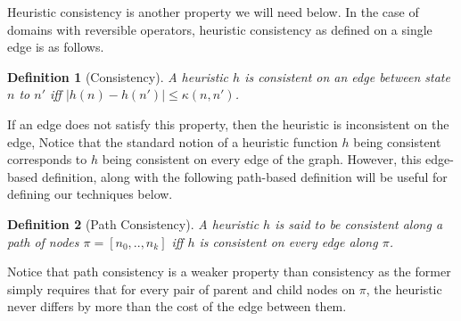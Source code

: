 \documentclass[letterpaper]{article}
\newtheorem{definition}{Definition}
\begin{document}


Heuristic consistency is another property we will need below. In the case of domains with reversible operators, heuristic consistency as defined on a single edge is as follows.

\begin{definition}[Consistency]
A heuristic $h$ is consistent on an edge between state $n$ to $n'$ iff $|h(n) - h(n')| \le \kappa(n,n')$.
\label{def:consistency}
\end{definition}
If an edge does not satisfy this property, then the heuristic is inconsistent on the edge,
Notice that the standard notion of a heuristic function $h$ being consistent corresponds to $h$ being consistent on every edge of the graph. However, this edge-based definition, along with the following path-based definition will be useful for defining our techniques below.


\begin{definition}[Path Consistency]
A heuristic $h$ is said to be consistent along a path of nodes $\pi=[n_0,..,n_k]$ iff $h$ is consistent on every edge along $\pi$. 
\end{definition}

Notice that path consistency is a weaker property than consistency as the former simply requires that for every pair of parent and child nodes on $\pi$, the heuristic never differs by more than the cost of the edge between them.

%
%
%
\end{document}
